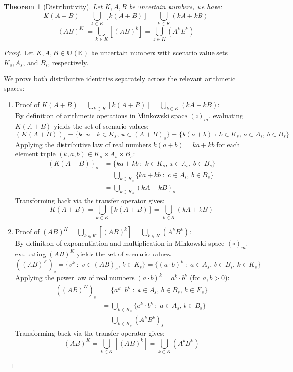 \documentclass[a4paper,12pt, twoside]{memoir}
\newtheorem{theorem}{Theorem}[chapter]
\newcommand{\tsbd}[1]{\mathbf{U}(\mathbb{#1})}
\begin{document}
\begin{theorem}[Distributivity]
	Let $K,A,B$ be uncertain numbers, we have:
	\[K(A+B)\ = \bigcup_{k \in K} [k(A+B)] = \bigcup_{k \in K} (kA+kB)\]
	\[(AB)^K\ = \bigcup_{k \in K} \left[(AB)^k \right] = \bigcup_{k \in K} \left(A^kB^k\right) \]
\end{theorem}
\begin{proof}
	Let $K, A, B \in \tsbd{K}$ be uncertain numbers with scenario value sets $K_s, A_s$, and $B_s$, respectively.

	We prove both distributive identities separately across the relevant arithmetic spaces:

	\begin{enumerate}[leftmargin=*]
		\item Proof of $K(A + B) = \bigcup_{k \in K} [k(A + B)] = \bigcup_{k \in K} (kA + kB)$: \\
		      By definition of arithmetic operations in Minkowski space $(\circ)_m$, evaluating $K(A + B)$ yields the set of scenario values:
		      \[
			      (K(A + B))_s = \{k \cdot u \;:\; k \in K_s, \, u \in (A + B)_s\} = \{k(a + b) \;:\; k \in K_s, \, a \in A_s, \, b \in B_s\}
		      \]
		      Applying the distributive law of real numbers $k(a + b) = ka + kb$ for each element tuple $(k, a, b) \in K_s \times A_s \times B_s$:
		      \begin{align*}
			      (K(A + B))_s & = \{ka + kb \;:\; k \in K_s, \, a \in A_s, \, b \in B_s\}       \\
			                   & = \bigcup_{k \in K_s} \{ka + kb \;:\; a \in A_s, \, b \in B_s\} \\
			                   & = \bigcup_{k \in K_s} (k A + k B)_s
		      \end{align*}
		      Transforming back via the transfer operator gives:
		      \[
			      K(A + B) = \bigcup_{k \in K} [k(A + B)] = \bigcup_{k \in K} (kA + kB)
		      \]

		\item Proof of $(AB)^K = \bigcup_{k \in K} \left[(AB)^k\right] = \bigcup_{k \in K} \left(A^k B^k\right)$: \\
		      By definition of exponentiation and multiplication in Minkowski space $(\circ)_m$, evaluating $(AB)^K$ yields the set of scenario values:
		      \[
			      ((AB)^K)_s = \{v^k \;:\; v \in (AB)_s, \, k \in K_s\} = \{(a \cdot b)^k \;:\; a \in A_s, \, b \in B_s, \, k \in K_s\}
		      \]
		      Applying the power law of real numbers $(a \cdot b)^k = a^k \cdot b^k$ (for $a, b > 0$):
		      \begin{align*}
			      ((AB)^K)_s & = \{a^k \cdot b^k \;:\; a \in A_s, \, b \in B_s, \, k \in K_s\}       \\
			                 & = \bigcup_{k \in K_s} \{a^k \cdot b^k \;:\; a \in A_s, \, b \in B_s\} \\
			                 & = \bigcup_{k \in K_s} (A^k B^k)_s
		      \end{align*}
		      Transforming back via the transfer operator gives:
		      \[
			      (AB)^K = \bigcup_{k \in K} \left[(AB)^k\right] = \bigcup_{k \in K} \left(A^k B^k\right)
		      \]
	\end{enumerate}


\end{proof}
\end{document}
